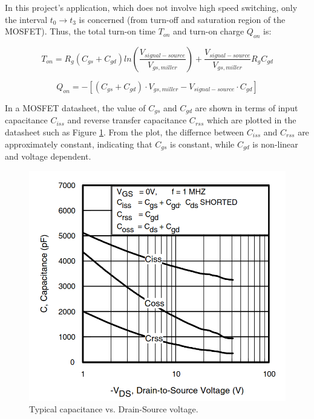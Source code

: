 \documentclass[main.tex]{subfiles}
\begin{document}
    \justify
    In this project's application, which does not involve high speed switching, only the interval $t_0 \rightarrow t_3$ is concerned (from turn-off and saturation region of the MOSFET). Thus, the total turn-on time $T_{on}$ and turn-on charge $Q_{on}$ is:

    \begin{equation} 
        T_{on} = R_{g}(C_{gs} +C_{gd})ln\left(\dfrac{V_{signal-source}}{V_{gs, miller}}\right) + \dfrac{V_{signal-source}}{V_{gs,miller}}R_{g}C_{gd}
    \end{equation}

    \begin{equation}
        Q_{on} = -[(C_{gs} +C_{gd})\cdot V_{gs, miller} - V_{signal-source}\cdot C_{gd}]
    \end{equation}

    \justify
    In a MOSFET datasheet, the value of $C_{gs}$ and $C_{gd}$ are shown in terms of input capacitance $C_{iss}$ and reverse transfer capacitance $C_{rss}$ which are plotted in the datasheet such as Figure \ref{fig:typical_capacitance_plot}. From the plot, the differnce between $C_{iss}$ and $C_{rss}$ are approximately constant, indicating that $C_{gs}$ is constant, while $C_{gd}$ is non-linear and voltage dependent.

    \begin{figure}[!h]
        \centerline{\includegraphics[scale=0.25]{media/typical_capacitance_plot.png}}
        \caption{Typical capacitance vs. Drain-Source voltage.}
        \label{fig:typical_capacitance_plot}
    \end{figure}
\end{document}
